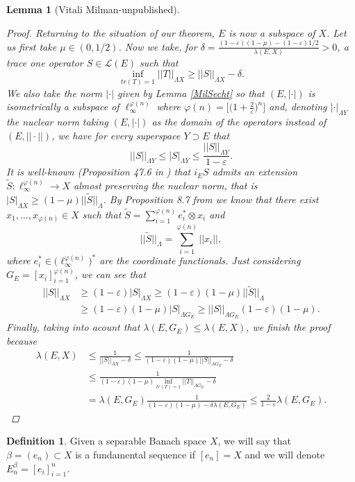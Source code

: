 \documentclass[11pt]{amsart}
\newcommand{\ep}{\varepsilon}
\newcommand{\<}{\langle}
\renewcommand{\>}{\rangle}
\newtheorem{lemma}[theorem]{Lemma}
\theoremstyle{definition}
\newtheorem{definition}[theorem]{Definition}
\theoremstyle{remark}
\numberwithin{equation}{section}
\begin{document}
\begin{lemma}[Vitali Milman-unpublished]
\begin{proof}
Returning to the situation of our theorem, $E$ is now a subspace of $X$. Let us first take $\mu\in(0,1/2)$. Now we take, for $\delta=\frac{(1-\ep)(1-\mu)-(1-\ep)1/2}{\lambda(E,X)}>0$, a trace one operator   $S\in\mathcal{L}(E)$ such that
$$\inf\limits_{tr(T)=1}||T||_{\Lambda X}\ge ||S||_{\Lambda X}-\delta.$$
We also take the norm $|\cdot|$ given by Lemma \ref{MilSecht} so that $(E,|\cdot|)$ is isometrically a subspace of $\ell_\infty^{\varphi(n)}$ where $\varphi(n)=\Big[\big( 1+\frac{2}{\ep} \big)^n\Big]$ and, denoting $|\cdot|_{\Lambda Y}$ the nuclear norm taking $(E,|\cdot|)$ as the domain of the operators instead of $(E,||\cdot||)$, we have for every superspace $Y\supset E$ that
$$ ||S||_{\Lambda Y}\le|S|_{\Lambda Y}\le \frac{||S||_{\Lambda Y}}{1-\ep}. $$
It is well-known (Proposition 47.6 in \cite{Tre06}) that $i_ES$ admits an extension $\widetilde{S}:\ell_\infty^{\varphi(n)}\rightarrow X$ almost preserving the nuclear norm, that is $|S|_{\Lambda X}\ge(1-\mu)||\widetilde{S}||_\Lambda$. By Proposition 8.7 from \cite{Tom89} we know that there exist $x_1,\dots,x_{\varphi(n)}\in X$ such that $\widetilde{S}=\sum\limits_{i=1}^{\varphi(n)}e_i^*\otimes x_i$ and
$$||\widetilde{S}||_{\Lambda}=\sum\limits_{i=1}^{\varphi(n)}||x_i||,$$
where $e_i^*\in\big(\ell_\infty^{\varphi(n)}\big)^*$ are the coordinate functionals.
Just considering $G_E=[x_i]_{i=1}^{\varphi(n)}$, we can see that
$$\begin{aligned}||S||_{\Lambda X}&\ge (1-\ep)|S|_{\Lambda X}\ge(1-\ep)(1-\mu)||\widetilde{S}||_{\Lambda}\\&\ge(1-\ep)(1-\mu)|S|_{\Lambda G_E}\ge||S||_{\Lambda G_E}(1-\ep)(1-\mu).\end{aligned}$$
Finally, taking into acount that $\lambda(E,G_E)\le\lambda(E,X)$,   we finish the proof because
$$\begin{aligned}\lambda(E,X)&\le\frac{1}{||S||_{\Lambda X}-\delta}\le \frac{1}{(1-\ep)(1-\mu)||S||_{\Lambda G_E}-\delta}
\\&\le\frac{1}{(1-\ep)(1-\mu)\inf\limits_{tr(T)=1}||T||_{\Lambda G_E}-\delta}\\&=\lambda(E,G_E)\frac{1}{(1-\ep)(1-\mu)-\delta\lambda(E,G_E)}\le\frac{2}{1-\ep}\lambda(E,G_E).\end{aligned}$$
\end{proof}
\end{lemma}

\begin{definition}
Given a separable Banach space $X$, we will say that $\beta=(e_n)\subset X$ is a fundamental sequence if $[e_n]=X$ and we will denote $E_n^{\beta}=[e_i]_{i=1}^n$.
\end{definition}
\end{document}
